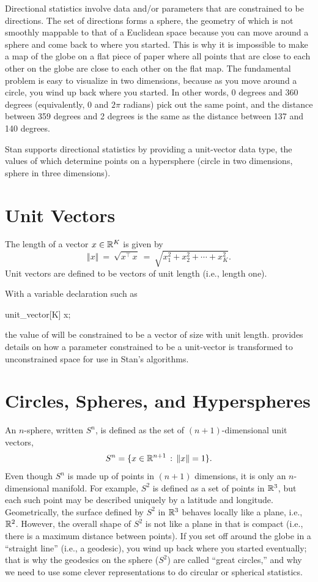 Directional statistics involve data and/or parameters that are
constrained to be directions.  The set of directions forms a sphere,
the geometry of which is not smoothly mappable to that of a Euclidean
space because you can move around a sphere and come back to where you
started.  This is why it is impossible to make a map of the globe on a
flat piece of paper where all points that are close to each other on
the globe are close to each other on the flat map.  The fundamental
problem is easy to visualize in two dimensions, because as you move
around a circle, you wind up back where you started.  In other words,
0 degrees and 360 degrees (equivalently, 0 and $2 \pi$ radians) pick
out the same point, and the distance between 359 degrees and 2 degrees
is the same as the distance between 137 and 140 degrees.

Stan supports directional statistics by providing a unit-vector data
type, the values of which determine points on a hypersphere (circle in
two dimensions, sphere in three dimensions).

\section{Unit Vectors}

The length of a vector $x \in \mathbb{R}^K$ is given by
\[
\Vert x \Vert
\ = \ \sqrt{x^{\top}\,x}
\ = \ \sqrt{x_1^2 + x_2^2 + \cdots + x_K^2}.
\]
Unit vectors are defined to be vectors of unit length (i.e., length
one).

With a variable declaration such as
%
\begin{stancode}
unit_vector[K] x;
\end{stancode}
%
the value of  will be constrained to be a vector of size
 with unit length.   provides details
on how a parameter constrained to be a unit-vector is transformed to
unconstrained space for use in Stan's algorithms.

\section{Circles, Spheres, and Hyperspheres}

An $n$-sphere, written $S^{n}$, is defined as the set of $(n +
1)$-dimensional unit vectors,
\[
S^{n} = \{ x \in \mathbb{R}^{n+1} \, : \, \Vert x \Vert = 1 \}.
\]
%
Even though $S^n$ is made up of points in $(n+1)$ dimensions, it is
only an $n$-dimensional manifold.  For example, $S^2$ is defined as a
set of points in $\mathbb{R}^3$, but each such point may be described
uniquely by a latitude and longitude.  Geometrically, the surface
defined by $S^2$ in $\mathbb{R}^3$ behaves locally like a plane, i.e.,
$\mathbb{R}^2$.  However, the overall shape of $S^2$ is not like a plane
in that is compact (i.e., there is a maximum distance between points).
If you set off around the globe in a ``straight line'' (i.e., a
geodesic), you wind up back where you started eventually; that is why
the geodesics on the sphere ($S^2$) are called ``great circles,'' and
why we need to use some clever representations to do circular or
spherical statistics.

